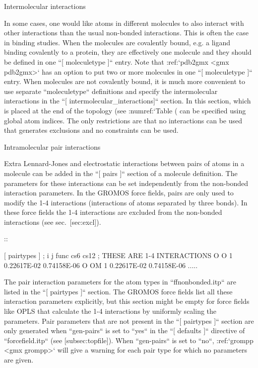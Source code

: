 Intermolecular interactions
~~~~~~~~~~~~~~~~~~~~~~~~~~~

In some cases, one would like atoms in different molecules to also
interact with other interactions than the usual non-bonded interactions.
This is often the case in binding studies. When the molecules are
covalently bound, e.g. a ligand binding covalently to a protein, they
are effectively one molecule and they should be defined in one
``[ moleculetype ]`` entry. Note that
:ref:`pdb2gmx <gmx pdb2gmx>` has an option to put two or more molecules in
one ``[ moleculetype ]`` entry. When molecules are not
covalently bound, it is much more convenient to use separate
``moleculetype`` definitions and specify the intermolecular
interactions in the ``[ intermolecular_interactions]``
section. In this section, which is placed at the end of the topology
(see :numref:`Table (%
can be specified using global atom indices. The only restrictions are
that no interactions can be used that generates exclusions and no
constraints can be used.

Intramolecular pair interactions
~~~~~~~~~~~~~~~~~~~~~~~~~~~~~~~~

Extra Lennard-Jones and electrostatic interactions between pairs of
atoms in a molecule can be added in the ``[ pairs ]`` section of a molecule
definition. The parameters for these interactions can be set
independently from the non-bonded interaction parameters. In the GROMOS
force fields, pairs are only used to modify the 1-4 interactions
(interactions of atoms separated by three bonds). In these force fields
the 1-4 interactions are excluded from the non-bonded interactions (see
sec. [sec:excl]).

::


    [ pairtypes ]
      ; i    j func         cs6          cs12 ; THESE ARE 1-4 INTERACTIONS
        O    O    1 0.22617E-02   0.74158E-06
        O   OM    1 0.22617E-02   0.74158E-06
        .....

The pair interaction parameters for the atom types in ``ffnonbonded.itp``
are listed in the ``[ pairtypes ]`` section. The GROMOS force fields list all these
interaction parameters explicitly, but this section might be empty for
force fields like OPLS that calculate the 1-4 interactions by uniformly
scaling the parameters. Pair parameters that are not present in the ``[ pairtypes ]``
section are only generated when ``gen-pairs`` is set to ``yes`` in the
``[ defaults ]`` directive of ``forcefield.itp`` (see [subsec:topfile]). When ``gen-pairs`` is
set to ``no``, :ref:`grompp <gmx grompp>` will give a warning for each pair type for which no
parameters are given.

